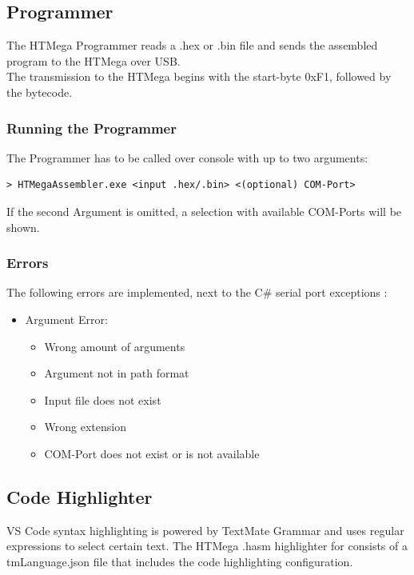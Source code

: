 \subsection{Programmer}
The HTMega Programmer reads a .hex or .bin file and sends the assembled program to the HTMega over USB.\\ 
The transmission to the HTMega begins with the start-byte 0xF1, followed by the bytecode.

\subsubsection{Running the Programmer}
The Programmer has to be called over console with up to two arguments:
\begin{mdframed}[backgroundcolor=light-gray, roundcorner=10pt,leftmargin=1, rightmargin=1, innerleftmargin=15, innertopmargin=6,innerbottommargin=6, outerlinewidth=1, linecolor=light-gray]
    \begin{lstlisting}[style=hasm]
    > HTMegaAssembler.exe <input .hex/.bin> <(optional) COM-Port>
    \end{lstlisting}
\end{mdframed}
If the second Argument is omitted, a selection with available COM-Ports will be shown.

\subsubsection{Errors}
The following errors are implemented, next to the C\# serial port exceptions \cite{serial-port-exceptions} :
\begin{itemize}
    \item Argument Error: 
    \begin{itemize}
        \item Wrong amount of arguments
        \item Argument not in path format 
        \item Input file does not exist 
        \item Wrong extension
        \item COM-Port does not exist or is not available
    \end{itemize}
\end{itemize}

\subsection{Code Highlighter}
VS Code syntax highlighting \cite{vscode-syntax} is powered by TextMate Grammar \cite{textmate-grammar} and uses regular expressions to select certain text.
The HTMega .hasm highlighter for consists of a tmLanguage.json file that includes the code highlighting configuration.\\

